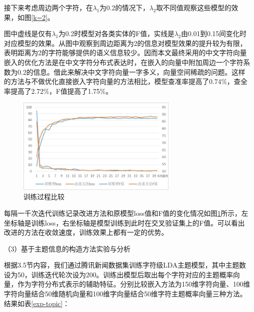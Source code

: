 \documentclass[winfonts,master,oneside,nobackinfo]{njuthesis}
\begin{document}
接下来考虑周边两个字符，在$\lambda_{1}$为0.2的情况下，$\lambda_{2}$取不同值观察这些模型的效果，如图\ref{k=2}。


图中虚线是仅有$\lambda_{1}$为0.2时模型对各类实体的F值，实线是$\lambda_{2}$由0.01到0.15间变化时对应模型的效果。从图中观察到周边距离为2的信息对模型效果的提升较为有限，表明距离为2的字符能够提供的语义信息较少。因而本文最终采用的中文字符向量嵌入的优化方法是在中文字符分布式表达时，在嵌入的向量中附加周边一个字符系数为0.2的信息。借此来解决中文字符向量一字多义，向量空间稀疏的问题。这样的方法与不做优化直接嵌入字符向量的方法相比，模型查准率提高了0.74\%，查全率提高了2.72\%，F值提高了1.75\%。

\begin{figure}[h]
\centering
\includegraphics[width=0.7\textwidth]{./figure/训练过程.jpg}
\caption{训练过程比较}
\label{train_step}
\end{figure}

每隔一千次迭代训练记录改进方法和原模型loss值和F值的变化情况如图\ref{train_step}所示，左坐标轴是训练loss，右坐标轴是模型训练到此时在交叉验证集上的F值。可以看出改进的方法在收敛速度，训练效果上都有一定的优势。

（3）基于主题信息的构造方法实验与分析

根据3.5节内容，我们通过腾讯新闻数据集训练字符级LDA主题模型，其中主题数设为50，训练迭代轮次设为200。训练出模型后取出每个字符对应的主题概率向量，作为字符分布式表示的辅助特征。分别比较嵌入方法为150维字符向量、100维字符向量结合50维随机向量和100维字向量结合50维字符主题概率向量三种方法。结果如表\ref{exp-topic}：
\end{document}
